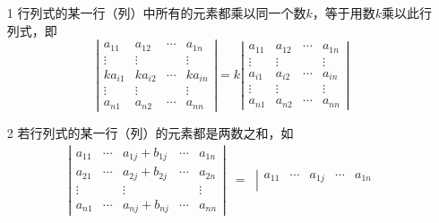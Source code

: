 \documentclass[10pt,a4paper%
tablecaptionabove]{article}
\begin{document}
\begin{CJK}{UTF8}{gkai}
  \begin{xingzhi}[线性性质]
    \begin{itemize}
    \item[1] 行列式的某一行（列）中所有的元素都乘以同一个数$k$，等于用数$k$乘以此行列式，即
      \begin{equation}\label{xz3-1}
        \left|
          \begin{array}{ccccc}
            a_{11}  & a_{12} & \cdots & a_{1n} \\
            \vdots & \vdots     &        & \vdots \\
            ka_{i1}  & ka_{i2} & \cdots & ka_{in} \\
            \vdots & \vdots     &        & \vdots \\
            a_{n1}  & a_{n2} & \cdots & a_{nn}
          \end{array}
        \right| = k
        \left|
          \begin{array}{ccccc}
            a_{11}  & a_{12} & \cdots & a_{1n} \\
            \vdots & \vdots     &        & \vdots \\
            a_{i1}  & a_{i2} & \cdots & a_{in} \\
            \vdots & \vdots     &        & \vdots \\
            a_{n1}  & a_{n2} & \cdots & a_{nn}
          \end{array}
        \right|
      \end{equation}
    \item[2] 若行列式的某一行（列）的元素都是两数之和，如       \begin{equation}\label{xz3-2}
        \begin{array}{rcl}
          \left|
          \begin{array}{ccccc}
            a_{11} & \cdots & a_{1j}+b_{1j} & \cdots & a_{1n} \\
            a_{21} & \cdots & a_{2j}+b_{2j} & \cdots & a_{2n} \\
            \vdots&        & \vdots      &        & \vdots \\
            a_{n1} & \cdots & a_{nj}+b_{nj} & \cdots & a_{nn}
          \end{array}
                                                       \right| & = & \left|
                                                                     \begin{array}{ccccc}
                                                                       a_{11} & \cdots & a_{1j} & \cdots & a_{1n} \\

\end{array}
\end{array}
\end{equation}
\end{itemize}
\end{xingzhi}
\end{CJK}
\end{document}
